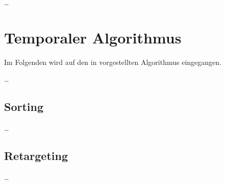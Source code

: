 \dots



\chapter{Temporaler Algorithmus}
\label{ch:TemporalerAlgorithmus}
Im Folgenden wird auf den in \cite{hal-02158423} vorgestellten Algorithmus eingegangen.

\dots


\section{Sorting}
\label{ch:Content2:sec:Sorting}


\dots


\section{Retargeting}
\label{ch:Content2:sec:Retargeting}


\dots
